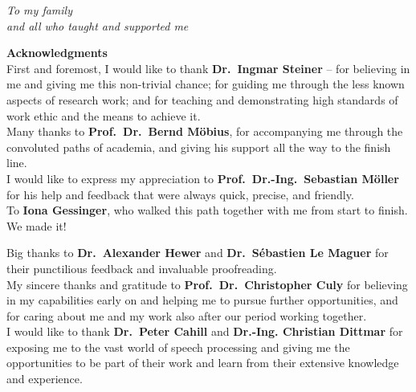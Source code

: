 
\mbox{} %
\newpage
\vspace*{4cm}
\begin{flushright}
        \textit{\large To my family\\and all who taught and supported me}
\end{flushright}
\newpage

\begin{center}
    {\calligra \fontsize{40}{50}\selectfont \textbf{Acknowledgments}}\\[1.7cm]
    \Large
	First and foremost, I would like to thank \textbf{Dr.\ Ingmar Steiner} -- for believing in me and giving me this non-trivial chance; for guiding me through the less known aspects of research work; and for teaching and demonstrating high standards of work ethic and the means to achieve it.\\[0.8cm]
	
	Many thanks to \textbf{ Prof.\ Dr.\ Bernd Möbius}, for accompanying me through the convoluted paths of academia, and giving his support all the way to the finish line.\\[0.8cm]
	
	I would like to express my appreciation to \textbf{Prof.\ Dr.-Ing.\ Sebastian Möller} for his help and feedback that were always quick, precise, and friendly.\\[0.8cm]
	
	To \textbf{Iona Gessinger}, who walked this path together with me from start to finish.
	We made it!\\[2cm]
	
	\vspace*{2cm}
	
	Big thanks to \textbf{Dr.\ Alexander Hewer} and \textbf{Dr.\ Sébastien Le Maguer} for their punctilious feedback and invaluable proofreading.\\[0.8cm]
	
	My sincere thanks and gratitude to \textbf{Prof.\ Dr.\ Christopher Culy} for believing in my capabilities early on and helping me to pursue further opportunities, and for caring about me and my work also after our period working together.\\[0.8cm]
	
	I would like to thank \textbf{Dr.\ Peter Cahill} and \textbf{Dr.-Ing. Christian Dittmar} for exposing me to the vast world of speech processing and giving me the opportunities to be part of their work and learn from their extensive knowledge and experience.\\[0.8cm]
	

\end{center}
